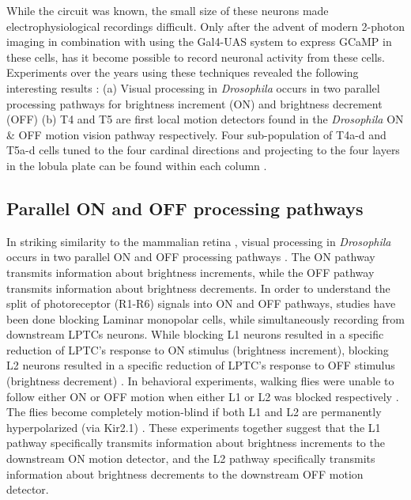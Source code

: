 While the circuit was known, the small size of these neurons made electrophysiological recordings difficult. Only after the advent of modern 2-photon imaging in combination with using the Gal4-UAS system to express GCaMP in these cells, has it become possible to record neuronal activity from these cells. Experiments over the years using these techniques revealed the following interesting results : (a) Visual processing in \textit{Drosophila} occurs in two parallel processing pathways for brightness increment (ON) and brightness decrement (OFF) \parencite{Joesch2010, Joesch2013, Strother2014, Eichner2011, Behnia2014} (b) T4 and T5 are first local motion detectors found in the \textit{Drosophila} ON \& OFF motion vision pathway respectively. Four sub-population of T4a-d and T5a-d cells tuned to the four cardinal directions and projecting to the four layers in the lobula plate can be found within each column \parencite{Maisak2013}. 


\subsection{Parallel ON and OFF processing pathways}
In striking similarity to the mammalian retina \parencite{Masland2012}, visual processing in \textit{Drosophila} occurs in two parallel ON and OFF processing pathways \parencite{Borst2015}. The ON pathway transmits information about brightness increments, while the OFF pathway transmits information about brightness decrements. In order to understand the split of photoreceptor (R1-R6) signals into ON and OFF pathways, studies have been done blocking Laminar monopolar cells, while simultaneously recording from downstream LPTCs neurons. While blocking L1 neurons resulted in a specific reduction of LPTC's response to ON stimulus (brightness increment), blocking L2 neurons resulted in a specific reduction of LPTC's response to OFF stimulus (brightness decrement) \parencite{Joesch2010}. In behavioral experiments, walking flies were unable to follow either ON or OFF motion when either L1 or L2 was blocked respectively \parencite{Clark2011}. The flies become completely motion-blind if both L1 and L2 are permanently hyperpolarized (via Kir2.1) \parencite{Tuthill2013, Bahl2013}. These experiments together suggest that the L1 pathway specifically transmits information about brightness increments to the downstream ON motion detector, and the L2 pathway specifically transmits information about brightness decrements to the downstream OFF motion detector. 


